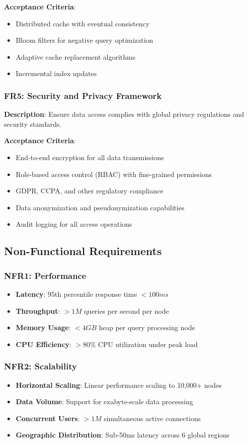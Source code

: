 \documentclass[11pt,a4paper]{article}
\begin{document}
\textbf{Acceptance Criteria}:
\begin{itemize}
\item Distributed cache with eventual consistency
\item Bloom filters for negative query optimization
\item Adaptive cache replacement algorithms
\item Incremental index updates
\end{itemize}

\subsubsection{FR5: Security and Privacy Framework}
\textbf{Description}: Ensure data access complies with global privacy regulations and security standards.

\textbf{Acceptance Criteria}:
\begin{itemize}
\item End-to-end encryption for all data transmissions
\item Role-based access control (RBAC) with fine-grained permissions
\item GDPR, CCPA, and other regulatory compliance
\item Data anonymization and pseudonymization capabilities
\item Audit logging for all access operations
\end{itemize}

\subsection{Non-Functional Requirements}

\subsubsection{NFR1: Performance}
\begin{itemize}
\item \textbf{Latency}: 95th percentile response time $< 100ms$
\item \textbf{Throughput}: $> 1M$ queries per second per node
\item \textbf{Memory Usage}: $< 4GB$ heap per query processing node
\item \textbf{CPU Efficiency}: $> 80\%$ CPU utilization under peak load
\end{itemize}

\subsubsection{NFR2: Scalability}
\begin{itemize}
\item \textbf{Horizontal Scaling}: Linear performance scaling to 10,000+ nodes
\item \textbf{Data Volume}: Support for exabyte-scale data processing
\item \textbf{Concurrent Users}: $> 1M$ simultaneous active connections
\item \textbf{Geographic Distribution}: Sub-50ms latency across 6 global regions
\end{itemize}
\end{document}
